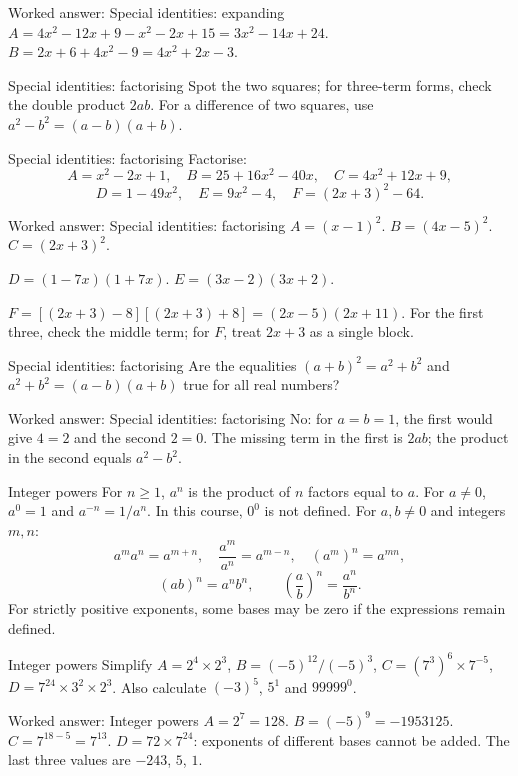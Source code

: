 \documentclass[aspectratio=169,10pt]{beamer}
\begin{document}
\begin{frame}{Worked answer: Special identities: expanding}
\(A=4x^2-12x+9-x^2-2x+15=3x^2-14x+24\). \(B=2x+6+4x^2-9=4x^2+2x-3\).
\end{frame}
\begin{frame}{Special identities: factorising}
Spot the two squares; for three-term forms, check the double product \(2ab\). For a difference of two squares, use \(a^2-b^2=(a-b)(a+b)\).
\end{frame}
\begin{frame}{Special identities: factorising}
Factorise:
\[A=x^2-2x+1,\quad B=25+16x^2-40x,\quad C=4x^2+12x+9,\]
\[D=1-49x^2,\quad E=9x^2-4,\quad F=(2x+3)^2-64.\]
\end{frame}
\begin{frame}{Worked answer: Special identities: factorising}
\(A=(x-1)^2\). \(B=(4x-5)^2\). \(C=(2x+3)^2\).

\(D=(1-7x)(1+7x)\). \(E=(3x-2)(3x+2)\).

\(F=[(2x+3)-8][(2x+3)+8]=(2x-5)(2x+11)\).
For the first three, check the middle term; for \(F\), treat \(2x+3\) as a single block.
\end{frame}
\begin{frame}{Special identities: factorising}
Are the equalities \((a+b)^2=a^2+b^2\) and \(a^2+b^2=(a-b)(a+b)\) true for all real numbers?
\end{frame}
\begin{frame}{Worked answer: Special identities: factorising}
No: for \(a=b=1\), the first would give \(4=2\) and the second \(2=0\). The missing term in the first is \(2ab\); the product in the second equals \(a^2-b^2\).
\end{frame}
\begin{frame}{Integer powers}
For \(n\geq1\), \(a^n\) is the product of \(n\) factors equal to \(a\). For \(a\ne0\), \(a^0=1\) and \(a^{-n}=1/a^n\). In this course, \(0^0\) is not defined.
For \(a,b\ne0\) and integers \(m,n\):
\[a^ma^n=a^{m+n},\quad\dfrac{a^m}{a^n}=a^{m-n},\quad(a^m)^n=a^{mn},\]
\[(ab)^n=a^nb^n,\qquad\left(\dfrac ab\right)^n=\dfrac{a^n}{b^n}.\]
For strictly positive exponents, some bases may be zero if the expressions remain defined.
\end{frame}
\begin{frame}{Integer powers}
Simplify \(A=2^4\times2^3\), \(B=(-5)^{12}/(-5)^3\), \(C=(7^3)^6\times7^{-5}\), \(D=7^{24}\times3^2\times2^3\). Also calculate \((-3)^5\), \(5^1\) and \(99999^0\).
\end{frame}
\begin{frame}{Worked answer: Integer powers}
\(A=2^7=128\). \(B=(-5)^9=-1953125\). \(C=7^{18-5}=7^{13}\). \(D=72\times7^{24}\): exponents of different bases cannot be added. The last three values are \(-243\), \(5\), \(1\).
\end{frame}
\end{document}
